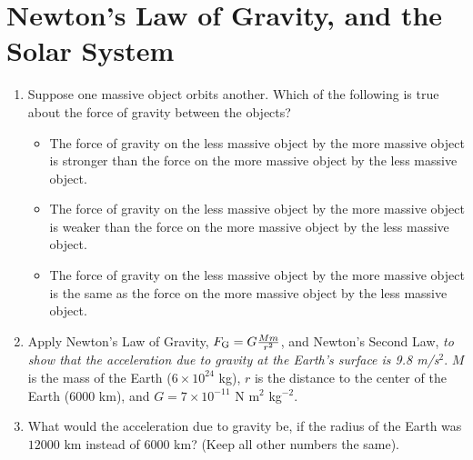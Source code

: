 \documentclass[10pt]{article}
\begin{document}
\section{Newton's Law of Gravity, and the Solar System}
\begin{enumerate}
\item Suppose one massive object orbits another.  Which of the following is true about the force of gravity between the objects?
\begin{itemize}
\item The force of gravity on the less massive object by the more massive object is stronger than the force on the more massive object by the less massive object.
\item The force of gravity on the less massive object by the more massive object is weaker than the force on the more massive object by the less massive object.
\item The force of gravity on the less massive object by the more massive object is the same as the force on the more massive object by the less massive object.
\end{itemize}
\item Apply Newton's Law of Gravity, $F_{\rm G} = G\frac{M m}{r^2}$, and Newton's Second Law, \textit{to show that the acceleration due to gravity at the Earth's surface is 9.8 m/s$^2$}.  $M$ is the mass of the Earth ($6\times 10^{24}$ kg), $r$ is the distance to the center of the Earth ($6000$ km), and $G = 7 \times 10^{-11}$ N m$^2$ kg$^{-2}$. \\ \vspace{2cm}
\item What would the acceleration due to gravity be, if the radius of the Earth was $12000$ km instead of $6000$ km? (Keep all other numbers the same). \\ \vspace{2cm}
\end{enumerate}
\end{document}
